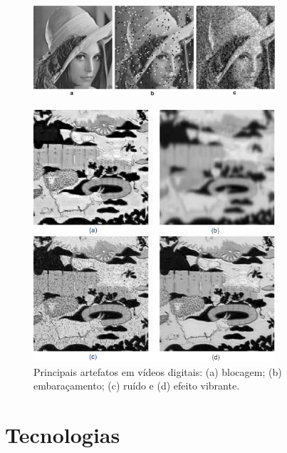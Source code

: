 \begin{figure}[!htb]
	\centering
	\includegraphics[width=0.8\textwidth]{./imgs/figura0.png}
	\caption{}
	\fonte{\cite{}}
\end{figure}

\begin{figure}[!htb]
	\centering
	\includegraphics[width=0.8\textwidth]{./imgs/figura1.png}
	\caption{Principais artefatos em vídeos digitais: (a) blocagem; (b) embaraçamento; (c) ruído e (d) efeito vibrante.}
\end{figure}

\section{Tecnologias}
